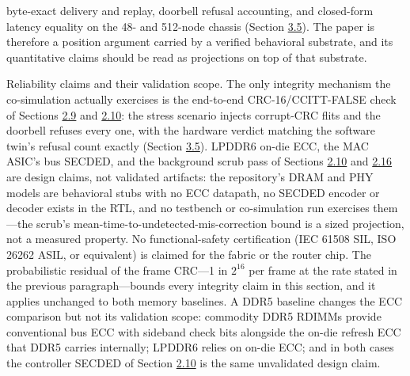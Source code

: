 \documentclass[12pt,onecolumn]{article}
\begin{document}
byte-exact delivery and replay, doorbell refusal accounting, and closed-form latency equality on the 48- and 512-node chassis (Section \hyperref[sec:3.5]{3.5}). The paper is therefore a position argument carried by a verified behavioral substrate, and its quantitative claims should be read as projections on top of that substrate.

Reliability claims and their validation scope. The only integrity mechanism the co-simulation actually exercises is the end-to-end CRC-16/CCITT-FALSE check of Sections \hyperref[sec:2.9]{2.9} and \hyperref[sec:2.10]{2.10}: the stress scenario injects corrupt-CRC flits and the doorbell refuses every one, with the hardware verdict matching the software twin's refusal count exactly (Section \hyperref[sec:3.5]{3.5}). LPDDR6 on-die ECC, the MAC ASIC's bus SECDED, and the background scrub pass of Sections \hyperref[sec:2.10]{2.10} and \hyperref[sec:2.16]{2.16} are design claims, not validated artifacts: the repository's DRAM and PHY models are behavioral stubs with no ECC datapath, no SECDED encoder or decoder exists in the RTL, and no testbench or co-simulation run exercises them---the scrub's mean-time-to-undetected-mis-correction bound is a sized projection, not a measured property. No functional-safety certification (IEC 61508 SIL, ISO 26262 ASIL, or equivalent) is claimed for the fabric or the router chip. The probabilistic residual of the frame CRC---1 in $2^{16}$ per frame at the rate stated in the previous paragraph---bounds every integrity claim in this section, and it applies unchanged to both memory baselines. A DDR5 baseline changes the ECC comparison but not its validation scope: commodity DDR5 RDIMMs provide conventional bus ECC with sideband check bits alongside the on-die refresh ECC that DDR5 carries internally; LPDDR6 relies on on-die ECC; and in both cases the controller SECDED of Section \hyperref[sec:2.10]{2.10} is the same unvalidated design claim.
\end{document}
